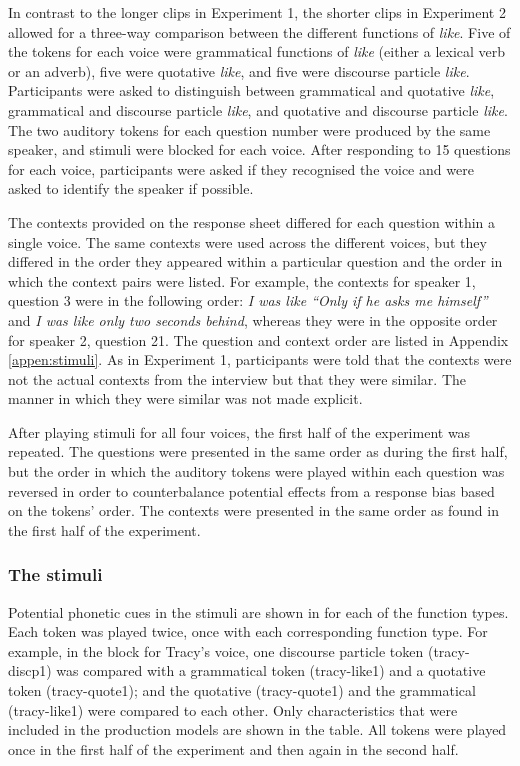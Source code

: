 In contrast to the longer clips in Experiment 1, the shorter clips in Experiment 2 allowed for a three-way comparison between the different functions of \textit{like}. Five of the tokens for each voice were grammatical functions of \textit{like} (either a lexical verb or an adverb), five were quotative \textit{like}, and five were discourse particle \textit{like}. Participants were asked to distinguish between grammatical and quotative \textit{like}, grammatical and discourse particle \textit{like}, and quotative and discourse particle \textit{like}. The two auditory tokens for each question number were produced by the same speaker, and stimuli were blocked for each voice. After responding to 15 questions for each voice, participants were asked if they recognised the voice and were asked to identify the speaker if possible. 

The contexts provided on the response sheet differed for each question within a single voice. The same contexts were used across the different voices, but they differed in the order they appeared within a particular question and the order in which the context pairs were listed. For example, the contexts for speaker 1, question 3 were in the following order: \textit{I was like ``Only if he asks me himself''} and \textit{I was like only two seconds behind}, whereas they were in the opposite order for speaker 2, question 21. The question and context order are listed in Appendix \ref{appen:stimuli}. As in Experiment 1, participants were told that the contexts were not the actual contexts from the interview but that they were similar. The manner in which they were similar was not made explicit.

After playing stimuli for all four voices, the first half of the experiment was repeated. The questions were presented in the same order as during the first half, but the order in which the auditory tokens were played within each question was reversed in order to counterbalance potential effects from a response bias based on the tokens' order. The contexts were presented in the same order as found in the first half of the experiment.


\subsubsection{The stimuli}

Potential phonetic cues in the stimuli are shown in  for each of the function types. Each token was played twice, once with each corresponding function type. For example, in the block for Tracy's voice, one discourse particle token (tracy-discp1) was compared with a grammatical token (tracy-like1) and a quotative token (tracy-quote1); and the quotative (tracy-quote1) and the grammatical (tracy-like1) were compared to each other. Only characteristics that were included in the production models are shown in the table. All tokens were played once in the first half of the experiment and then again in the second half. 


